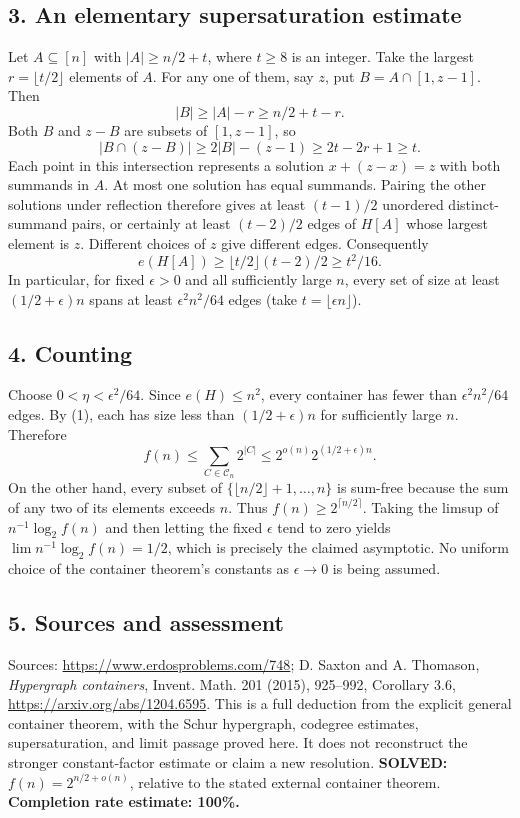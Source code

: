 \subsection*{3. An elementary supersaturation estimate}
Let $A\subseteq[n]$ with $|A|\ge n/2+t$, where $t\ge8$ is an integer. Take the largest $r=\lfloor t/2\rfloor$ elements of $A$. For any one of them, say $z$, put $B=A\cap[1,z-1]$. Then
\[
 |B|\ge |A|-r\ge n/2+t-r.
\]
Both $B$ and $z-B$ are subsets of $[1,z-1]$, so
\[
 |B\cap(z-B)|\ge2|B|-(z-1)\ge2t-2r+1\ge t.
\]
Each point in this intersection represents a solution $x+(z-x)=z$ with both summands in $A$. At most one solution has equal summands. Pairing the other solutions under reflection therefore gives at least $(t-1)/2$ unordered distinct-summand pairs, or certainly at least $(t-2)/2$ edges of $H[A]$ whose largest element is $z$. Different choices of $z$ give different edges. Consequently
\[
 e(H[A])\ge\lfloor t/2\rfloor(t-2)/2\ge t^2/16. \tag{1}
\]
In particular, for fixed $\epsilon>0$ and all sufficiently large $n$, every set of size at least $(1/2+\epsilon)n$ spans at least $\epsilon^2 n^2/64$ edges (take $t=\lfloor\epsilon n\rfloor$).
\subsection*{4. Counting}
Choose $0<\eta<\epsilon^2/64$. Since $e(H)\le n^2$, every container has fewer than $\epsilon^2n^2/64$ edges. By (1), each has size less than $(1/2+\epsilon)n$ for sufficiently large $n$. Therefore
\[
 f(n)\le\sum_{C\in\mathcal C_n}2^{|C|}
 \le2^{o(n)}2^{(1/2+\epsilon)n}.
\]
On the other hand, every subset of $\{\lfloor n/2\rfloor+1,\ldots,n\}$ is sum-free because the sum of any two of its elements exceeds $n$. Thus $f(n)\ge2^{\lceil n/2\rceil}$.
Taking the limsup of $n^{-1}\log_2f(n)$ and then letting the fixed $\epsilon$ tend to zero yields $\lim n^{-1}\log_2 f(n)=1/2$, which is precisely the claimed asymptotic. No uniform choice of the container theorem's constants as $\epsilon\to0$ is being assumed.
\subsection*{5. Sources and assessment}
Sources: \url{https://www.erdosproblems.com/748}; D. Saxton and A. Thomason, \emph{Hypergraph containers}, Invent. Math. 201 (2015), 925--992, Corollary 3.6, \url{https://arxiv.org/abs/1204.6595}.
This is a full deduction from the explicit general container theorem, with the Schur hypergraph, codegree estimates, supersaturation, and limit passage proved here. It does not reconstruct the stronger constant-factor estimate or claim a new resolution.
\textbf{SOLVED:} $f(n)=2^{n/2+o(n)}$, relative to the stated external container theorem.
\textbf{Completion rate estimate: 100\%.}
